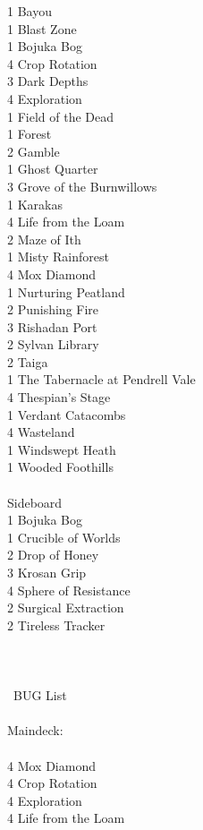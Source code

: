 \documentclass{report}
\begin{document}
1 Bayou\\
1 Blast Zone\\
1 Bojuka Bog\\
4 Crop Rotation\\
3 Dark Depths\\
4 Exploration\\
1 Field of the Dead\\
1 Forest\\
2 Gamble\\
1 Ghost Quarter\\
3 Grove of the Burnwillows\\
1 Karakas\\
4 Life from the Loam\\
2 Maze of Ith\\
1 Misty Rainforest\\
4 Mox Diamond\\
1 Nurturing Peatland\\
2 Punishing Fire\\
3 Rishadan Port\\
2 Sylvan Library\\
2 Taiga\\
1 The Tabernacle at Pendrell Vale\\
4 Thespian's Stage\\
1 Verdant Catacombs\\
4 Wasteland\\
1 Windswept Heath\\
1 Wooded Foothills\\\\
Sideboard\\
1 Bojuka Bog\\
1 Crucible of Worlds\\
2 Drop of Honey\\
3 Krosan Grip\\
4 Sphere of Resistance\\
2 Surgical Extraction\\
2 Tireless Tracker\\\\\\\\\
BUG List\\\\
Maindeck:\\\\
4 Mox Diamond\\
4 Crop Rotation\\
4 Exploration\\
4 Life from the Loam\\
\end{document}
